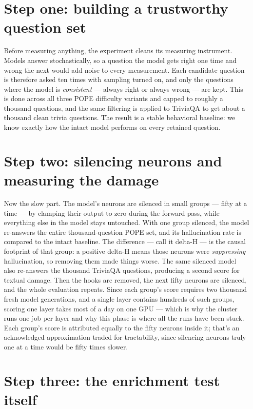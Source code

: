 \documentclass[11pt,a4paper]{article}
\begin{document}
\section*{Step one: building a trustworthy question set}

Before measuring anything, the experiment cleans its measuring instrument. Models
answer stochastically, so a question the model gets right one time and wrong the
next would add noise to every measurement. Each candidate question is therefore
asked ten times with sampling turned on, and only the questions where the model is
\emph{consistent} --- always right or always wrong --- are kept. This is done across
all three POPE difficulty variants and capped to roughly a thousand questions, and
the same filtering is applied to TriviaQA to get about a thousand clean trivia
questions. The result is a stable behavioral baseline: we know exactly how the
intact model performs on every retained question.

\section*{Step two: silencing neurons and measuring the damage}

Now the slow part. The model's neurons are silenced in small groups --- fifty at a
time --- by clamping their output to zero during the forward pass, while everything
else in the model stays untouched. With one group silenced, the model re-answers the
entire thousand-question POPE set, and its hallucination rate is compared to the
intact baseline. The difference --- call it delta-H --- is the causal footprint of
that group: a positive delta-H means those neurons were \emph{suppressing}
hallucination, so removing them made things worse. The same silenced model also
re-answers the thousand TriviaQA questions, producing a second score for textual
damage. Then the hooks are removed, the next fifty neurons are silenced, and the
whole evaluation repeats. Since each group's score requires two thousand fresh model
generations, and a single layer contains hundreds of such groups, scoring one layer
takes most of a day on one GPU --- which is why the cluster runs one job per layer
and why this phase is where all the runs have been stuck. Each group's score is
attributed equally to the fifty neurons inside it; that's an acknowledged
approximation traded for tractability, since silencing neurons truly one at a time
would be fifty times slower.

\section*{Step three: the enrichment test itself}
\end{document}
